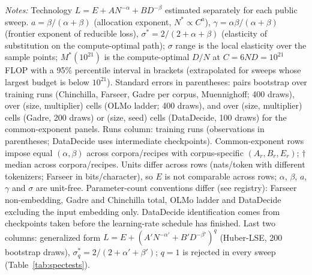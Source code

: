 \begin{landscape}
\begin{table}[!htbp]
\begin{threeparttable}
\begin{tabular}{lcccccccccccc}
\bottomrule
\end{tabular}
\begin{tablenotes}[flushleft]
\footnotesize
\item \textit{Notes:} Technology $L=E+AN^{-\alpha}+BD^{-\beta}$ estimated separately for each public sweep. $a=\beta/(\alpha+\beta)$ (allocation exponent, $N^*\propto C^{a}$), $\gamma=\alpha\beta/(\alpha+\beta)$ (frontier exponent of reducible loss), $\sigma^*=2/(2+\alpha+\beta)$ (elasticity of substitution on the compute-optimal path); $\sigma$ range is the local elasticity over the sample points; $M^*(10^{21})$ is the compute-optimal $D/N$ at $C=6ND=10^{21}$ FLOP with a 95\% percentile interval in brackets (extrapolated for sweeps whose largest budget is below $10^{21}$). Standard errors in parentheses: pairs bootstrap over training runs (Chinchilla, Farseer, Gadre per corpus, Muennighoff; 400 draws), over (size, multiplier) cells (OLMo ladder; 400 draws), and over (size, multiplier) cells (Gadre, 200 draws) or (size, seed) cells (DataDecide, 100 draws) for the common-exponent panels. Runs column: training runs (observations in parentheses; DataDecide uses intermediate checkpoints). Common-exponent rows impose equal $(\alpha,\beta)$ across corpora/recipes with corpus-specific $(A_r,B_r,E_r)$; $\dagger$ median across corpora/recipes. Units differ across rows (nats/token with different tokenizers; Farseer in bits/character), so $E$ is not comparable across rows; $\alpha$, $\beta$, $a$, $\gamma$ and $\sigma$ are unit-free. Parameter-count conventions differ (see registry): Farseer non-embedding, Gadre and Chinchilla total, OLMo ladder and DataDecide excluding the input embedding only. DataDecide identification comes from checkpoints taken before the learning-rate schedule has finished. Last two columns: generalized form $L=E+(A'N^{-\alpha'}+B'D^{-\beta'})^{q}$ (Huber-LSE, 200 bootstrap draws), $\sigma^*_q=2/(2+\alpha'+\beta')$; $q=1$ is rejected in every sweep (Table~\ref{tab:spectests}).
\end{tablenotes}
\end{threeparttable}
\end{table}
\end{landscape}
